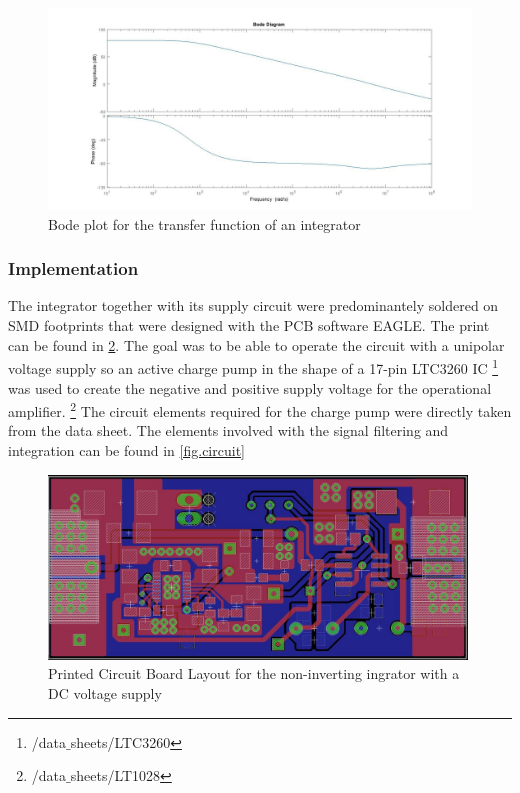 \begin{figure}[h!tb]
\includegraphics[width=\textwidth]{figures/Method/integrator/transferfunction_int.jpg}
\caption[Kurze Abbildungsbeschreibung]{Bode plot for the transfer function of an integrator}
\label{fig.Bodeplot}
\end{figure}

\subsubsection{Implementation}
The integrator together with its supply circuit were predominantely soldered on SMD footprints that were designed
with the PCB software EAGLE. The print can be found in \ref{fig.solder}.
The goal was to be able to operate the circuit with a unipolar voltage supply so an active charge pump in the 
shape of a 17-pin LTC3260 IC \footnote{/data$\_$sheets/LTC3260} was used to create the negative and positive supply voltage for the operational amplifier.
\footnote{/data$\_$sheets/LT1028}
The circuit elements required for the charge pump were directly taken from the data sheet. The elements involved with the signal 
filtering and integration can be found in \ref{fig.circuit}

\begin{figure}
\includegraphics[width=0.99\textwidth]{figures/Method/integrator/PCB_Integrator.png}
    \caption{Printed Circuit Board Layout for the non-inverting ingrator with a DC voltage supply} 
    \label{fig.solder}
\end{figure}
    
